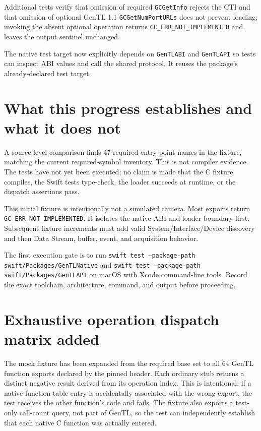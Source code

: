 \documentclass[11pt,a4paper]{report}
\begin{document}
Additional tests verify that omission of required \texttt{GCGetInfo} rejects the CTI and that omission of optional GenTL 1.1 \texttt{GCGetNumPortURLs} does not prevent loading; invoking the absent optional operation returns \texttt{GC\_ERR\_NOT\_IMPLEMENTED} and leaves the output sentinel unchanged.

The native test target now explicitly depends on \texttt{GenTLABI} and \texttt{GenTLAPI} so tests can inspect ABI values and call the shared protocol. It reuses the package's already-declared test target.

\section{What this progress establishes and what it does not}
A source-level comparison finds 47 required entry-point names in the fixture, matching the current required-symbol inventory. This is not compiler evidence. The tests have not yet been executed; no claim is made that the C fixture compiles, the Swift tests type-check, the loader succeeds at runtime, or the dispatch assertions pass.

This initial fixture is intentionally not a simulated camera. Most exports return \texttt{GC\_ERR\_NOT\_IMPLEMENTED}. It isolates the native ABI and loader boundary first. Subsequent fixture increments must add valid System/Interface/Device discovery and then Data Stream, buffer, event, and acquisition behavior.

The first execution gate is to run \texttt{swift test --package-path swift/Packages/GenTLNative} and \texttt{swift test --package-path swift/Packages/GenTLAPI} on macOS with Xcode command-line tools. Record the exact toolchain, architecture, command, and output before proceeding.



\section{Exhaustive operation dispatch matrix added}
The mock fixture has been expanded from the required base set to all 64 GenTL function exports declared by the pinned header. Each ordinary stub returns a distinct negative result derived from its operation index. This is intentional: if a native function-table entry is accidentally associated with the wrong export, the test receives the other function's code and fails. The fixture also exports a test-only call-count query, not part of GenTL, so the test can independently establish that each native C function was actually entered.
\end{document}
